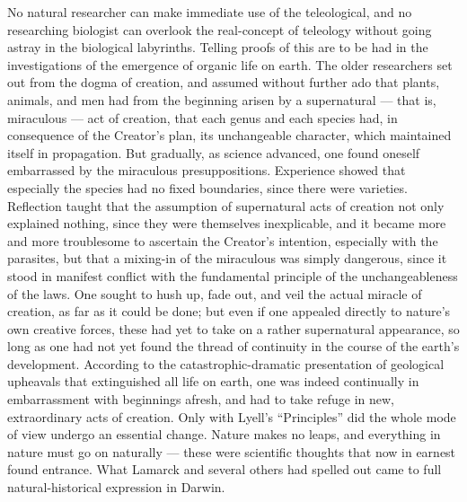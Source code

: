 \documentclass[12pt]{book}
\begin{document}
\noindent No natural researcher can make immediate use of the teleological, and no
researching biologist can overlook the real-concept of teleology without going astray in
the biological labyrinths. Telling proofs of this are to be had in the investigations of
the emergence of organic life on earth. The older researchers set out from the dogma of
creation, and assumed without further ado that plants, animals, and men had from the
beginning arisen by a supernatural --- that is, miraculous --- act of creation, that each
genus and each species had, in consequence of the Creator's plan, its unchangeable
character, which maintained itself in propagation. But gradually, as science advanced, one
found oneself embarrassed by the miraculous presuppositions. Experience showed that
especially the species had no fixed boundaries, since there were varieties. Reflection
taught that the assumption of supernatural acts of creation not only explained nothing,
since they were themselves inexplicable, and it became more and more troublesome to
ascertain the Creator's intention, especially with the parasites, but that a mixing-in of
the miraculous was simply dangerous, since it stood in manifest conflict with the
fundamental principle of the unchangeableness of the laws. One sought to hush up, fade out,
and veil the actual miracle of creation, as far as it could be done; but even if one
appealed directly to nature's own creative forces, these had yet to take on a rather
supernatural appearance, so long as one had not yet found the thread of continuity in the
course of the earth's development. According to the catastrophic-dramatic presentation of
geological upheavals that extinguished all life on earth, one was indeed continually in
embarrassment with beginnings afresh, and had to take refuge in new, extraordinary acts of
creation. Only with Lyell's ``Principles'' did the whole mode of view undergo an essential
change. Nature makes no leaps, and everything in nature must go on naturally --- these
were scientific thoughts that now in earnest found entrance. What Lamarck and several others
had spelled out came to full natural-historical expression in Darwin.
\end{document}
